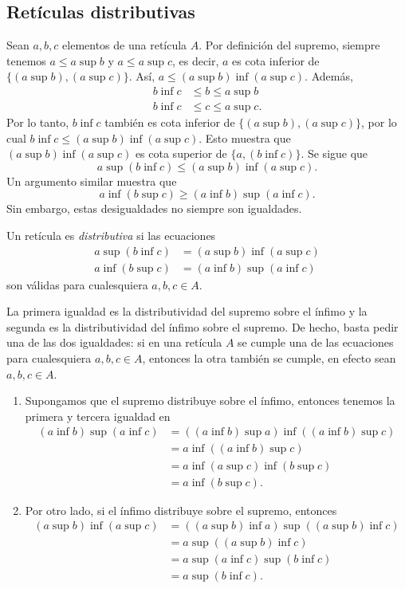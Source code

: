 \subsection{Retículas distributivas}\label{distr}

Sean $a,b,c$ elementos de una retícula $A$.
Por definición del supremo, siempre tenemos
$a\leq a\sup b$ y $a\leq a\sup c$,
es decir, $a$ es cota inferior de $\{(a\sup b),(a\sup c)\}$.
Así, $a\leq (a\sup b)\inf(a\sup c)$.
Además,
\begin{align*}
  b\inf c &\leq b\leq a\sup b \\
  b\inf c &\leq c\leq a\sup c.
\end{align*}
Por lo tanto, $b\inf c$ también es cota inferior de $\{(a\sup
b),(a\sup c)\}$, por lo cual $b\inf c\leq(a\sup b)\inf(a\sup c)$.
Esto muestra que $(a\sup b)\inf(a\sup c)$ es cota superior de
$\{a,(b\inf c)\}$. Se sigue que
\[
  a\sup(b\inf c)
  \leq (a\sup b)\inf(a\sup c)
.\]
Un argumento similar muestra que
\[
  a\inf(b\sup c)
  \geq (a\inf b)\sup(a\inf c)
.\]
Sin embargo, estas desigualdades no siempre son igualdades.

\begin{definition}\label{distri}
  

Un retícula es \emph{ distributiva } si las ecuaciones
\begin{align*}
  a\sup(b\inf c) &= (a\sup b)\inf (a\sup c) \\
  a\inf(b\sup c) &= (a\inf b)\sup(a\inf c)
\end{align*}
son válidas para cualesquiera $a,b,c\in A$.
\end{definition}
La primera igualdad es la distributividad del supremo sobre el
ínfimo y la segunda es la distributividad del ínfimo sobre el
supremo.
De hecho, basta pedir una de las dos igualdades:
si en una retícula $A$ se cumple una de las ecuaciones para
cualesquiera $a,b,c\in A$, entonces la otra también se cumple, en efecto
sean $a,b,c\in A$.
    \begin{enumerate}
      \item
      Supongamos que el supremo distribuye sobre el ínfimo,
      entonces tenemos la primera y tercera igualdad en
      \begin{align*}
          (a\inf b)\sup(a\inf c)
          &= ((a\inf b)\sup a)\inf((a\inf b)\sup c) \\
          &= a\inf((a\inf b)\sup c) \\
          &= a\inf(a\sup c)\inf (b\sup c) \\
          &= a\inf (b\sup c).
      \end{align*}

      \item
      Por otro lado, si el ínfimo distribuye sobre el
      supremo, entonces
      \begin{align*}
          (a\sup b)\inf(a\sup c)
          &= ((a\sup b)\inf a)\sup((a\sup b)\inf c) \\
          &= a\sup((a\sup b)\inf c) \\
          &= a\sup (a\inf c)\sup (b\inf c) \\
          &= a\sup (b\inf c).
      \end{align*}
    \end{enumerate}


